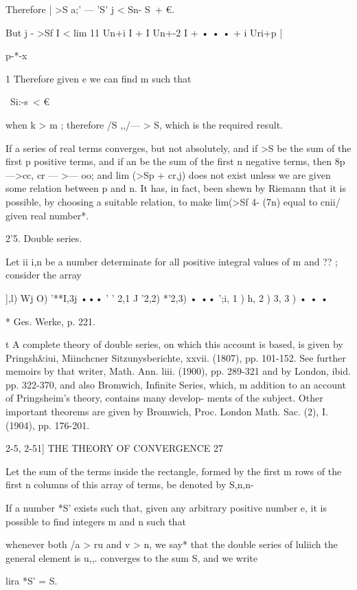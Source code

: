 Therefore | >S a;' — 'S' j < Sn- S\ + €.

But j - >Sf I < lim 11 Un+i I + I Un+-2 I + • • • + i Uri+p |

p-*-x

1 Therefore given e we can find m such that

\ Si:-s\ < €

when k > m ; therefore /S ,,/— > S, which is the required result.

If a series of real terms converges, but not absolutely, and if >S be
the sum of the first p positive terms, and if an be the sum of the
first n negative terms, then 8p—>cc, cr — >— oo; and lim (>Sp + cr,j)
does not exist unless we are given some relation between p and n. It
has, in fact, been shewn by Riemann that it is possible, by choosing a
suitable relation, to make lim(>Sf 4- (7n) equal to cnii/ given real
number*.

2'5. Double series.

Let ii i,n be a number determinate for all positive integral values of
m and ?? ; consider the array

 ],l) Wj O) '**I,3j ••• ' ' 2,1 J '2,2) *'2,3) • •• ';i, 1 ) h, 2 ) 3,
3 ) • • •



* Ges. Werke, p. 221.

t A complete theory of double series, on which this account is based,
is given by Pringsh\&iui, Miinchcner Sitzunysberichte, xxvii. (1807),
pp. 101-152. See further memoirs by that writer, Math. Ann. liii.
(1900), pp. 289-321 and by London, ibid. pp. 322-370, and also
Bromwich, Infinite Series, which, m addition to an account of
Pringsheim's theory, contains many develop- ments of the subject.
Other important theorems are given by Bromwich, Proc. London Math.
Sac. (2), I. (1904), pp. 176-201.



2-5, 2-51] THE THEORY OF CONVERGENCE 27

Let the sum of the terms inside the rectangle, formed by the first m
rows of the first n columns of this array of terms, be denoted by
S,n,n-

If a number *S' exists such that, given any arbitrary positive number
e, it is possible to find integers m and n such that

whenever both /a > ru and v > n, we say* that the double series of
luliich the general element is u,,. converges to the sum S, and we
write

lira *S' = S.



